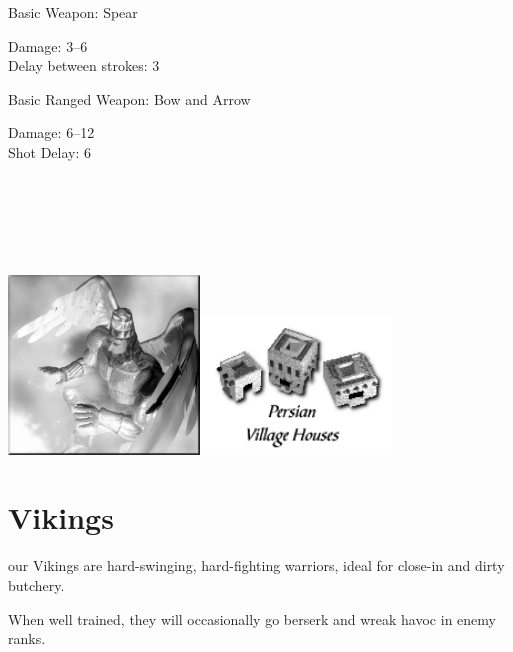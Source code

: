 Basic Weapon: Spear
\begin{adjustwidth}{1cm}{}
	Damage: 3–6 \\
	Delay between strokes: 3
\end{adjustwidth}
Basic Ranged Weapon: Bow and Arrow
\begin{adjustwidth}{1cm}{}
	Damage: 6–12 \\
	Shot Delay: 6 \\ \\ \\ \\ \\ \\
\end{adjustwidth}

\begin{center}
	\includegraphics[width=2in]{Ahealinglord}\hspace{1pt}\includegraphics[width=2in]{Ipersianhouse}
\end{center}

\clearpage

\section{Vikings}


our Vikings are hard-swinging, hard-fighting warriors, ideal for close-in and dirty butchery.

When well trained, they will occasionally go berserk and wreak havoc in enemy ranks.


